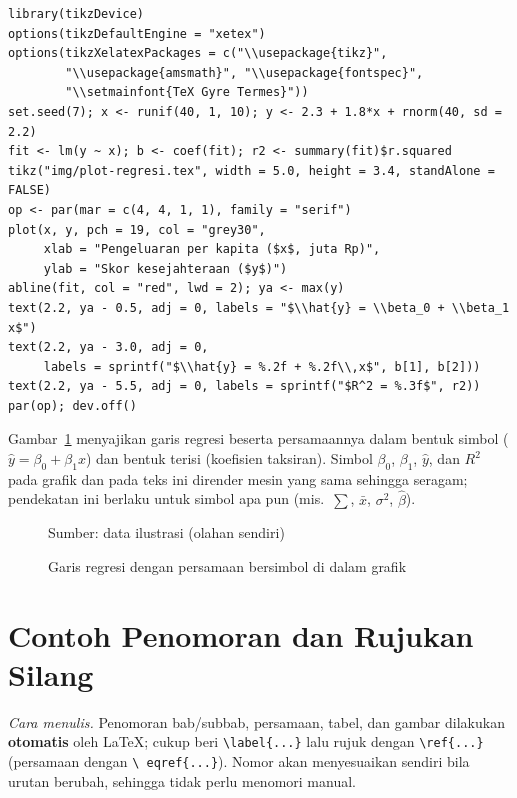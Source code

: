 \begin{lstlisting}
library(tikzDevice)
options(tikzDefaultEngine = "xetex")
options(tikzXelatexPackages = c("\\usepackage{tikz}",
        "\\usepackage{amsmath}", "\\usepackage{fontspec}",
        "\\setmainfont{TeX Gyre Termes}"))
set.seed(7); x <- runif(40, 1, 10); y <- 2.3 + 1.8*x + rnorm(40, sd = 2.2)
fit <- lm(y ~ x); b <- coef(fit); r2 <- summary(fit)$r.squared
tikz("img/plot-regresi.tex", width = 5.0, height = 3.4, standAlone = FALSE)
op <- par(mar = c(4, 4, 1, 1), family = "serif")
plot(x, y, pch = 19, col = "grey30",
     xlab = "Pengeluaran per kapita ($x$, juta Rp)",
     ylab = "Skor kesejahteraan ($y$)")
abline(fit, col = "red", lwd = 2); ya <- max(y)
text(2.2, ya - 0.5, adj = 0, labels = "$\\hat{y} = \\beta_0 + \\beta_1 x$")
text(2.2, ya - 3.0, adj = 0,
     labels = sprintf("$\\hat{y} = %.2f + %.2f\\,x$", b[1], b[2]))
text(2.2, ya - 5.5, adj = 0, labels = sprintf("$R^2 = %.3f$", r2))
par(op); dev.off()
\end{lstlisting}

Gambar~\ref{gbr:reg} menyajikan garis regresi beserta persamaannya dalam bentuk simbol
($\hat{y} = \beta_0 + \beta_1 x$) dan bentuk terisi (koefisien taksiran). Simbol
$\beta_0$, $\beta_1$, $\hat{y}$, dan $R^2$ pada grafik dan pada teks ini dirender mesin
yang sama sehingga seragam; pendekatan ini berlaku untuk simbol apa pun (mis.\ $\sum$,
$\bar{x}$, $\sigma^2$, $\hat{\beta}$).

\begin{figure}[H]
\centering
\sbox\skripsiblokbox{}%
\usebox\skripsiblokbox\par
\addvspace{0.4\spasi}
\parbox[t]{\wd\skripsiblokbox}{\raggedright\setlength{\parindent}{0pt}\small Sumber: data ilustrasi (olahan sendiri)}\par
\caption{Garis regresi dengan persamaan bersimbol di dalam grafik}
\label{gbr:reg}
\end{figure}

\section{Contoh Penomoran dan Rujukan Silang}
\emph{Cara menulis.} Penomoran bab/subbab, persamaan, tabel, dan gambar dilakukan
\textbf{otomatis} oleh LaTeX; cukup beri \texttt{\textbackslash label\{...\}} lalu rujuk
dengan \texttt{\textbackslash ref\{...\}} (persamaan dengan \texttt{\textbackslash
eqref\{...\}}). Nomor akan menyesuaikan sendiri bila urutan berubah, sehingga tidak
perlu menomori manual.

